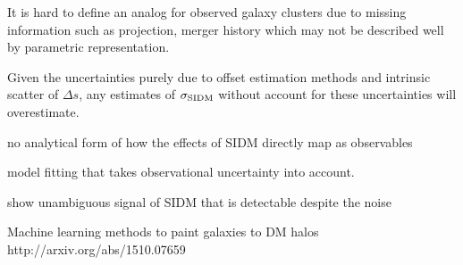 It is hard to define an analog for observed galaxy clusters due to missing
information such as projection, merger history which may not be described well
by parametric representation.

Given the uncertainties purely due to offset estimation methods and 
intrinsic scatter of $\Delta s$, any estimates of $\sigma_{\rm SIDM}$ without
account for these uncertainties will overestimate. 

  


no analytical form of how the effects of SIDM directly map as observables  
 
model fitting that takes  observational uncertainty into account. 

show unambiguous signal of SIDM that is detectable despite the noise 
 
Machine learning methods to paint galaxies to DM halos 
http://arxiv.org/abs/1510.07659


